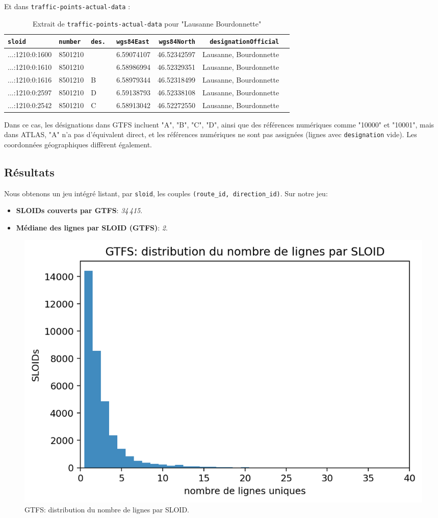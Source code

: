 Et dans \texttt{traffic-points-actual-data} :

\begin{table}[H]
\caption{Extrait de \texttt{traffic-points-actual-data} pour "Lausanne Bourdonnette"}
\label{tab:traffic_bourdonnette_2}
\centering
\begin{tabular}{l l l l r r l}
\toprule
\texttt{sloid} & \texttt{number} & \texttt{des.
}  & \texttt{wgs84East} & \texttt{wgs84North} & \texttt{designationOfficial} \\
\midrule
...:1210:0:1600 & 8501210 &  & 6.59074107 & 46.52342597 & Lausanne, Bourdonnette \\
...:1210:0:1610 & 8501210 &  & 6.58986994 & 46.52329351 & Lausanne, Bourdonnette \\
...:1210:0:1616 & 8501210 & B & 6.58979344 & 46.52318499 & Lausanne, Bourdonnette \\
...:1210:0:2597 & 8501210 & D & 6.59138793 & 46.52338108 & Lausanne, Bourdonnette \\
...:1210:0:2542 & 8501210 & C & 6.58913042 & 46.52272550 & Lausanne, Bourdonnette \\
\bottomrule
\end{tabular}
\end{table}

Dans ce cas, les désignations dans GTFS incluent "A", "B", "C", "D", ainsi que des références numériques comme "10000" et "10001", mais dans ATLAS,  "A" n’a pas d’équivalent direct, et les références numériques ne sont pas assignées (lignes avec \texttt{designation} vide). Les coordonnées géographiques diffèrent également.

\subsection{Résultats}
Nous obtenons un jeu intégré listant, par \texttt{sloid}, les couples \texttt{(route\_id, direction\_id)}. Sur notre jeu:
\begin{itemize}
  \item \textbf{SLOIDs couverts par GTFS}: \textit{34\,415}.
  \item \textbf{Médiane des lignes par SLOID (GTFS)}: \textit{2}.
\end{itemize}

\begin{figure}[h]
  \centering
  \includegraphics[width=.7\linewidth]{figures/plots/gtfs_routes_per_sloid.png}
  \caption[GTFS: lignes par SLOID]{GTFS: distribution du nombre de lignes par SLOID.}
  \label{fig:gtfs_lines_per_sloid}
\end{figure}

